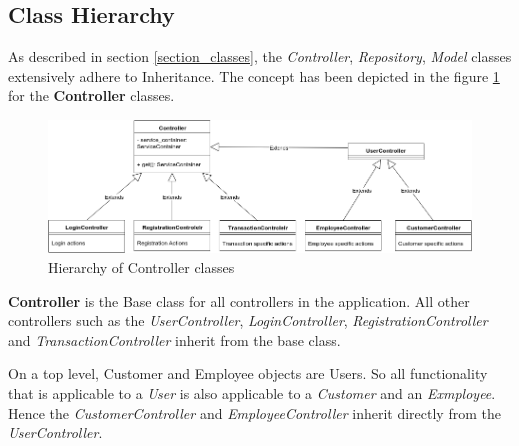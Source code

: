 \subsection{Class Hierarchy}

As described in section \ref{section_classes}, the \textit{Controller}, \textit{Repository}, \textit{Model} classes extensively adhere to Inheritance. The concept has been depicted in the figure \ref{fig:controller_hierarchy} for the \textbf{Controller} classes.

\begin{figure}[ht]
	\centering
	\includegraphics[width=0.9\linewidth]{figures/controller_hierarchy.png}
	\caption{Hierarchy of Controller classes}
	\label{fig:controller_hierarchy}
\end{figure}

\textbf{Controller} is the Base class for all controllers in the application. All other controllers such as the \textit{UserController}, \textit{LoginController}, \textit{RegistrationController} and \textit{TransactionController} inherit from the base class. 

On a top level, Customer and Employee objects are Users. So all functionality that is applicable to a \textit{User} is also applicable to a \textit{Customer} and an \textit{Exmployee}. Hence the \textit{CustomerController} and \textit{EmployeeController} inherit directly from the \textit{UserController}.

\clearpage